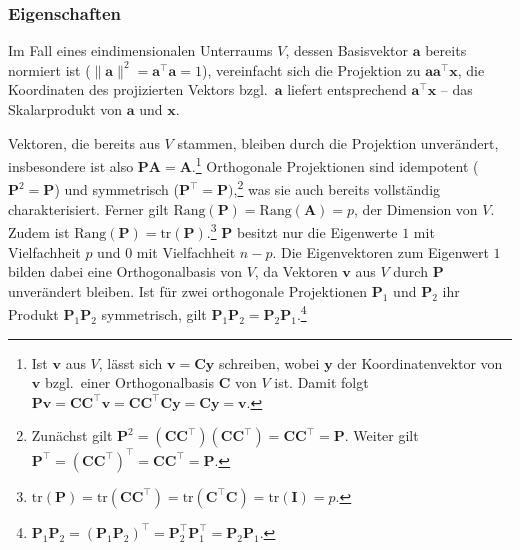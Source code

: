 \subsubsection{Eigenschaften}

Im Fall eines eindimensionalen Unterraums $V$, dessen Basisvektor $\bm{a}$ bereits normiert ist ($\|\bm{a}\|^{2} =  \bm{a}^{\top} \bm{a} = 1$), vereinfacht sich die Projektion zu $\bm{a} \bm{a}^{\top} \bm{x}$, die Koordinaten des projizierten Vektors bzgl.\ $\bm{a}$ liefert entsprechend $\bm{a}^{\top} \bm{x}$ -- das Skalarprodukt von $\bm{a}$ und $\bm{x}$.

Vektoren, die bereits aus $V$ stammen, bleiben durch die Projektion unverändert, insbesondere ist also $\bm{P} \bm{A} = \bm{A}$.\footnote{Ist $\bm{v}$ aus $V$, lässt sich $\bm{v} = \bm{C} \bm{y}$ schreiben, wobei $\bm{y}$ der Koordinatenvektor von $\bm{v}$ bzgl.\ einer Orthogonalbasis $\bm{C}$ von $V$ ist. Damit folgt $\bm{P} \bm{v} = \bm{C} \bm{C}^{\top} \bm{v} = \bm{C} \bm{C}^{\top} \bm{C} \bm{y} = \bm{C} \bm{y} = \bm{v}$.} Orthogonale Projektionen sind idempotent ($\bm{P}^{2} = \bm{P}$) und symmetrisch ($\bm{P}^{\top} = \bm{P})$,\footnote{Zunächst gilt $\bm{P}^{2} = (\bm{C} \bm{C}^{\top}) (\bm{C} \bm{C}^{\top}) = \bm{C} \bm{C}^{\top} = \bm{P}$. Weiter gilt $\bm{P}^{\top} = (\bm{C} \bm{C}^{\top})^{\top} = \bm{C} \bm{C}^{\top} = \bm{P}$.} was sie auch bereits vollständig charakterisiert. Ferner gilt $\text{Rang}(\bm{P}) = \text{Rang}(\bm{A}) = p$, der Dimension von $V$. Zudem ist $\text{Rang}(\bm{P}) = \text{tr}(\bm{P})$.\footnote{$\text{tr}(\bm{P}) = \text{tr}(\bm{C} \bm{C}^{\top}) = \text{tr}(\bm{C}^{\top} \bm{C}) = \text{tr}(\bm{I}) = p$.} $\bm{P}$ besitzt nur die Eigenwerte $1$ mit Vielfachheit $p$ und $0$ mit Vielfachheit $n-p$. Die Eigenvektoren zum Eigenwert $1$ bilden dabei eine Orthogonalbasis von $V$, da Vektoren $\bm{v}$ aus $V$ durch $\bm{P}$ unverändert bleiben. Ist für zwei orthogonale Projektionen $\bm{P}_{1}$ und $\bm{P}_{2}$ ihr Produkt $\bm{P}_{1} \bm{P}_{2}$ symmetrisch, gilt $\bm{P}_{1} \bm{P}_{2} = \bm{P}_{2} \bm{P}_{1}$.\footnote{$\bm{P}_{1} \bm{P}_{2} = (\bm{P}_{1} \bm{P}_{2})^{\top} = \bm{P}_{2}^{\top} \bm{P}_{1}^{\top} = \bm{P}_{2} \bm{P}_{1}$.}

